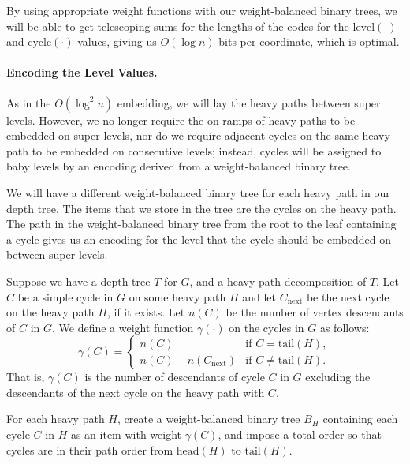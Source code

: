 \documentclass[11pt]{article}
\newcommand{\cycle}{\mathrm{cycle}}
\newcommand{\level}{\mathrm{level}}
\newcommand{\head}{\mathrm{head}}
\newcommand{\tail}{\mathrm{tail}}
\renewcommand{\subsection}[1]{\paragraph{#1.}}
\begin{document}
\ifFull By using appropriate weight functions with our weight-balanced 
binary trees, we will be able to get telescoping sums
for the lengths of the codes for the $\level(\cdot)$ 
and $\cycle(\cdot)$ values, 
giving us $O(\log{n})$ bits per coordinate, which is optimal. \fi


\subsection{Encoding the Level Values}
\ifFull
As in the $O(\log^2{n})$ embedding, we will lay the heavy paths between 
super levels. However, we no longer require the on-ramps of heavy paths to be
embedded on super levels, nor do we require adjacent cycles on the same 
heavy path to be embedded on consecutive levels; instead, cycles will be
assigned to baby levels by an encoding derived from a 
weight-balanced binary tree. \fi

\ifFull
We will have a different weight-balanced binary tree for each heavy path
in our depth tree. 
The items that we store in the tree are the cycles on the heavy path. 
The path in the weight-balanced binary tree from the root to 
the leaf containing a cycle gives us an encoding for the $\level$ that the 
cycle should be embedded on between super levels. 
\fi

Suppose we have a depth tree $T$ for $G$, and a heavy path 
decomposition of $T$. Let $C$ be a simple cycle in $G$ on some heavy path
$H$ and let $C_{\mathrm{next}}$ be the next cycle on the heavy path $H$,
if it exists. Let $n(C)$ be the number of vertex descendants of 
$C$ in $G$. We define a weight function $\gamma(\cdot)$ on the cycles 
in $G$ as follows:
{\small
\[
\gamma(C) = \begin{cases}
         n(C)&\text{if $C = \tail(H)$}, \\
         n(C) - n(C_{\mathrm{next}})&\text{if $C \neq \tail(H)$}.
         \end{cases}
\]
}
\ifFull \noindent That is, $\gamma(C)$ is the number of descendants of cycle $C$ in $G$ 
excluding the descendants of the next cycle on the heavy path with $C$. \fi

For each heavy path $H$, create a weight-balanced binary tree $B_H$ containing
each cycle $C$ in $H$ as an item with weight $\gamma(C)$, and impose a total order 
so that cycles are in their path order from $\head(H)$ to $\tail(H)$. 
\end{document}
